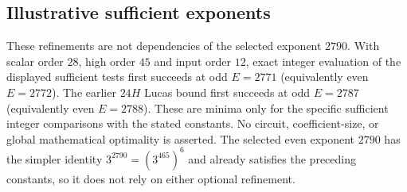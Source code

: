 \subsection{Illustrative sufficient exponents}

These refinements are not dependencies of the selected exponent $2790$.
With scalar order $28$, high order $45$ and input order $12$, exact
integer evaluation of the displayed sufficient tests first succeeds at
odd $E=2771$ (equivalently even $E=2772$).  The earlier $24H$ Lucas
bound first succeeds at odd $E=2787$ (equivalently even $E=2788$).
These are minima only for the specific sufficient integer comparisons
with the stated constants.  No circuit, coefficient-size, or global
mathematical optimality is asserted.  The selected even exponent $2790$
has the simpler identity $3^{2790}=(3^{465})^6$ and already satisfies the
preceding constants, so it does not rely on either optional refinement.
